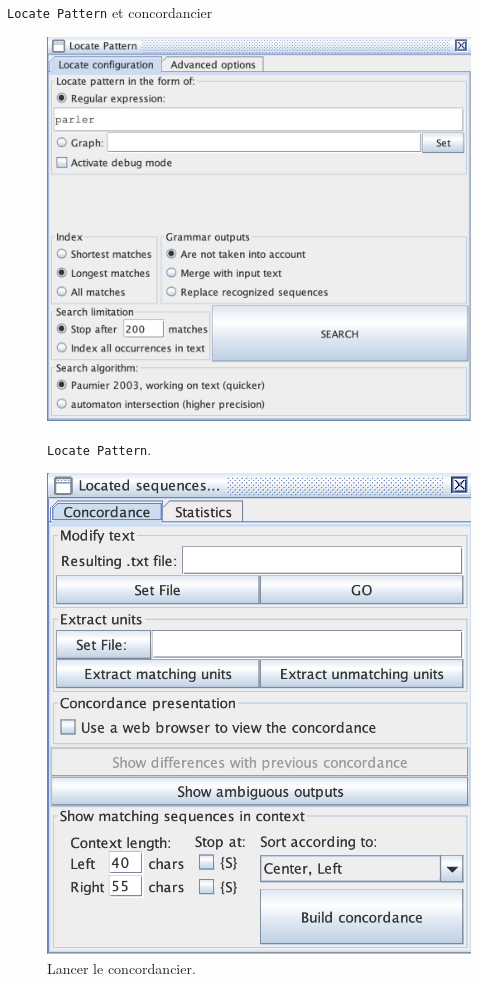 \documentclass[xetex,xcolor={table,usenames,dvipsnames}]{beamer}
\begin{document}
\begin{frame}{\texttt{Locate Pattern} et concordancier}
		   \begin{figure}[ht]
		\begin{minipage}[b]{0.45\linewidth}
			\centering
			\includegraphics[width=\textwidth]{img/locate_pattern.png}
			\caption{\texttt{Locate Pattern}.}
			\label{fig:a}
		\end{minipage}
		\hspace{0.5cm}
		\begin{minipage}[b]{0.45\linewidth}
			\centering
			\includegraphics[width=\textwidth]{img/concordancier.png}
			\caption{Lancer le concordancier.}
			\label{fig:b}
		\end{minipage}
	\end{figure}
	

\end{frame}
\end{document}
